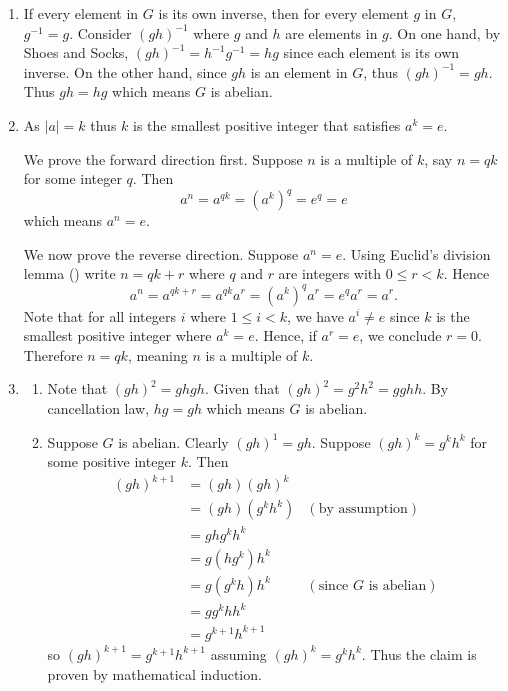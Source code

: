 \begin{enumerate}
    \item If every element in $G$ is its own inverse, then for every element $g$ in $G$, $g^{-1} = g$. Consider $(gh)^{-1}$ where $g$ and $h$ are elements in $g$. On one hand, by Shoes and Socks, $(gh)^{-1} = h^{-1}g^{-1} = hg$ since each element is its own inverse. On the other hand, since $gh$ is an element in $G$, thus $(gh)^{-1} = gh$. Thus $gh = hg$ which means $G$ is abelian.
    
    \item As $|a| = k$ thus $k$ is the smallest positive integer that satisfies $a^k = e$.
    
    We prove the forward direction first. Suppose $n$ is a multiple of $k$, say $n = qk$ for some integer $q$. Then
    \[
        a^n = a^{qk} = \left(a^k\right)^q = e^q = e    
    \]
    which means $a^n = e$.
    
    We now prove the reverse direction. Suppose $a^n = e$. Using Euclid's division lemma () write $n = qk + r$ where $q$ and $r$ are integers with $0 \leq r < k$. Hence
    \[
        a^n = a^{qk + r} = a^{qk}a^r = \left(a^k\right)^qa^r = e^qa^r = a^r.
    \]
    Note that for all integers $i$ where $1 \leq i < k$, we have $a^i \neq e$ since $k$ is the smallest positive integer where $a^k = e$. Hence, if $a^r = e$, we conclude $r = 0$. Therefore $n = qk$, meaning $n$ is a multiple of $k$.

    \item \begin{enumerate}[label=(\alph*)]
        \item Note that $(gh)^2 = ghgh$. Given that $(gh)^2 = g^2h^2 = gghh$. By cancellation law, $hg = gh$ which means $G$ is abelian.
        \item Suppose $G$ is abelian. Clearly $(gh)^1 = gh$. Suppose $(gh)^{k} = g^kh^k$ for some positive integer $k$. Then
        \begin{align*}
            (gh)^{k+1} &= (gh)(gh)^k\\
            &= (gh)(g^kh^k) & (\text{by assumption})\\
            &= ghg^kh^k\\
            &= g(hg^k)h^k\\
            &= g(g^kh)h^k & (\text{since } G \text{ is abelian})\\
            &= gg^khh^k\\
            &= g^{k+1}h^{k+1}
        \end{align*}
        so $(gh)^{k+1} = g^{k+1}h^{k+1}$ assuming $(gh)^k = g^kh^k$. Thus the claim is proven by mathematical induction.
    \end{enumerate}


\end{enumerate}

